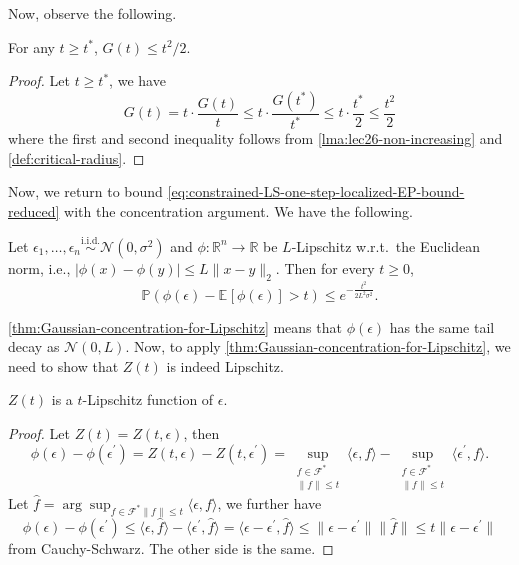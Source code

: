 Now, observe the following.

\begin{corollary}\label{col:lec26-non-increasing}
	For any \(t \geq t^{\ast} \), \(G(t) \leq t^2 / 2\).
\end{corollary}
\begin{proof}
	Let \(t \geq t^{\ast} \), we have
	\[
		G(t)
		= t \cdot \frac{G(t)}{t}
		\leq t \cdot \frac{G(t^{\ast} )}{t^{\ast} }
		\leq t \cdot \frac{t^{\ast} }{2}
		\leq \frac{t^2}{2}
	\]
	where the first and second inequality follows from \autoref{lma:lec26-non-increasing} and \autoref{def:critical-radius}.
\end{proof}

Now, we return to bound \autoref{eq:constrained-LS-one-step-localized-EP-bound-reduced} with the concentration argument. We have the following.

\begin{theorem}\label{thm:Gaussian-concentration-for-Lipschitz}
	Let \(\epsilon _1, \dots , \epsilon _n \overset{\text{i.i.d.} }{\sim } \mathcal{N} (0, \sigma ^2)\) and \(\phi \colon \mathbb{R} ^n \to \mathbb{R} \) be \(L\)-Lipschitz w.r.t.\ the Euclidean norm, i.e., \(\vert \phi (x) - \phi (y) \vert \leq L \lVert x - y \rVert _2\). Then for every \(t \geq 0\),
	\[
		\mathbb{P} \left( \phi (\epsilon ) - \mathbb{E}_{}\left[\phi (\epsilon ) \right] > t \right) \leq e^{-\frac{t^2}{2L^2 \sigma ^2}}.
	\]
\end{theorem}

\autoref{thm:Gaussian-concentration-for-Lipschitz} means that \(\phi (\epsilon )\) has the same tail decay as \(\mathcal{N} (0, L)\). Now, to apply \autoref{thm:Gaussian-concentration-for-Lipschitz}, we need to show that \(Z(t)\) is indeed Lipschitz.

\begin{lemma}\label{lma:lec26-Lipschitz}
	\(Z(t)\) is a \(t\)-Lipschitz function of \(\epsilon \).
\end{lemma}
\begin{proof}
	Let \(Z(t) = Z(t, \epsilon )\), then
	\[
		\phi (\epsilon ) - \phi (\epsilon ^{\prime} )
		= Z(t, \epsilon ) - Z(t, \epsilon ^{\prime} )
		= \sup _{\substack{f\in \mathscr{F} ^{\ast} \\ \lVert f \rVert \leq t}} \langle \epsilon , f \rangle - \sup _{\substack{f\in \mathscr{F} ^{\ast} \\ \lVert f \rVert \leq t}} \langle \epsilon ^{\prime} , f \rangle.
	\]
	Let \(\hat{f} = \arg \sup _{f\in \mathscr{F} ^{\ast} \lVert f \rVert \leq t} \langle \epsilon , f \rangle\), we further have
	\[
		\phi (\epsilon ) - \phi (\epsilon ^{\prime} )
		\leq \langle \epsilon , \hat{f} \rangle - \langle \epsilon ^{\prime} , \hat{f} \rangle
		= \langle \epsilon - \epsilon ^{\prime} , \hat{f}  \rangle
		\leq \lVert \epsilon - \epsilon ^{\prime} \rVert \lVert \hat{f} \rVert
		\leq t\lVert \epsilon - \epsilon ^{\prime} \rVert
	\]
	from Cauchy-Schwarz. The other side is the same.
\end{proof}

